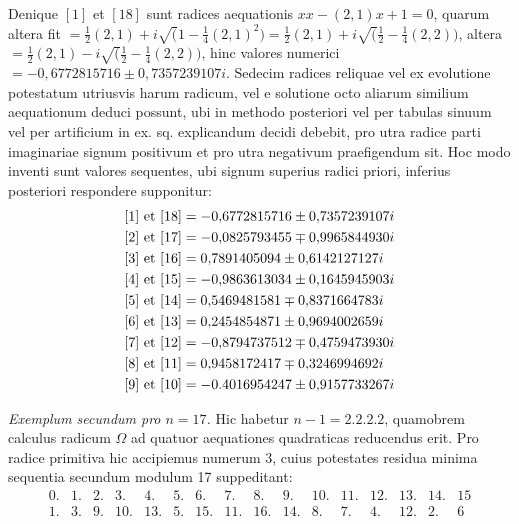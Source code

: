 Denique \([1]\) et \([18]\) sunt radices aequationis \(xx-(2,1)x+1=0\), quarum altera fit \(=\frac12(2,1)+i\surd(1-\frac14(2,1)^2)=\frac12(2,1)+i\surd(\frac12-\frac14(2,2))\), altera \(=\frac12(2,1)-i\surd(\frac12-\frac14(2,2))\), hinc valores numerici \(=-0{,}6772815716\pm0{,}7357239107i\). Sedecim radices reliquae vel ex evolutione potestatum utriusvis harum radicum, vel e solutione octo aliarum similium aequationum deduci possunt, ubi in methodo posteriori vel per tabulas sinuum vel per artificium in ex. sq. explicandum decidi debebit, pro utra radice parti imaginariae signum positivum et pro utra negativum praefigendum sit. Hoc modo inventi sunt valores sequentes, ubi signum superius radici priori, inferius posteriori respondere supponitur: \[\begin{aligned}\relax[1]\text{ et }[18]&=-0{,}6772815716\pm0{,}7357239107i\\\relax[2]\text{ et }[17]&=-0{,}0825793455\mp0{,}9965844930i\\\relax[3]\text{ et }[16]&=0{,}7891405094\pm0{,}6142127127i\\\relax[4]\text{ et }[15]&=-0{,}9863613034\pm0{,}1645945903i\\\relax[5]\text{ et }[14]&=0{,}5469481581\mp0{,}8371664783i\\\relax[6]\text{ et }[13]&=0{,}2454854871\pm0{,}9694002659i\\\relax[7]\text{ et }[12]&=-0{,}8794737512\mp0{,}4759473930i\\\relax[8]\text{ et }[11]&=0{,}9458172417\mp0{,}3246994692i\\\relax[9]\text{ et }[10]&=-0.4016954247\pm0{,}9157733267i\end{aligned}\]


\textit{Exemplum secundum pro \(n=17\).} Hic habetur \(n-1=2.2.2.2\), quamobrem calculus radicum \(\Omega\) ad quatuor aequationes quadraticas reducendus erit. Pro radice primitiva hic accipiemus numerum 3, cuius potestates residua minima sequentia secundum modulum 17 suppeditant: {\small\setlength{\arraycolsep}{2pt}\[\begin{array}{rrrrrrrrrrrrrrrr}0.&1.&2.&3.&4.&5.&6.&7.&8.&9.&10.&11.&12.&13.&14.&15\\1.&3.&9.&10.&13.&5.&15.&11.&16.&14.&8.&7.&4.&12.&2.&6\end{array}\]}

